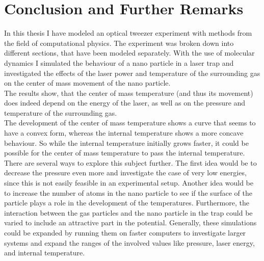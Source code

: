 \documentclass[12pt]{article}
\begin{document}
\newpage
\section{Conclusion and Further Remarks}
In this thesis I have modeled an optical tweezer experiment with methods from the field of computational physics. The experiment was broken down into
different sections, that have been modeled separately. With the use of molecular dynamics I simulated the behaviour of a nano particle in a laser trap
and investigated the effects of the laser power and temperature of the surrounding gas on the center of mass movement of the nano particle.\\
The results show, that the center of mass temperature (and thus its movement) does indeed depend on the energy of the laser, as well as on the
pressure and temperature of the surrounding gas.\\
The development of the center of mass temperature shows a curve that seems to have a convex form, whereas the internal temperature shows a more
concave behaviour. So while the internal temperature initially grows faster, it could be possible for the center of mass temperature to pass the
internal temperature.\\
There are several ways to explore this subject further. The first idea would be to decrease the pressure even more and investigate the case of very low
energies, since this is not easily feasible in an experimental setup. Another idea would be to increase the number of atoms in the nano particle to
see if the surface of the particle plays a role in the development of the temperatures. Furthermore, the interaction between the gas particles and the
nano particle in the trap could be varied to include an attractive part in the potential. Generally, these simulations could be expanded by running
them on faster computers to investigate larger systems and expand the ranges of the involved values like pressure, laser
energy, and internal temperature.




\newpage


\end{document}
